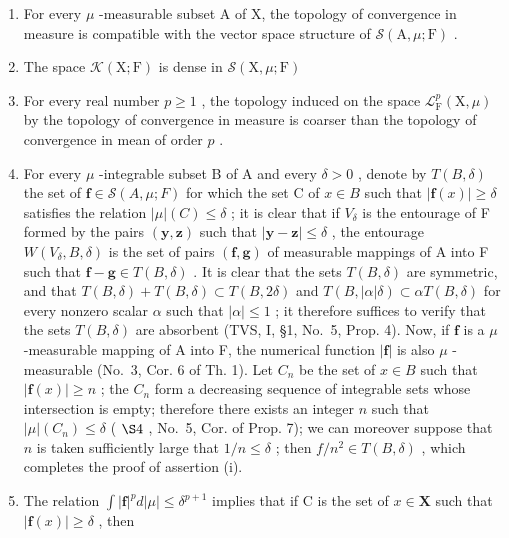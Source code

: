 \begin{enumerate}
\def\labelenumi{(\roman{enumi})}
\item
  For every \(\mu\) -measurable subset A of X, the topology of convergence in measure is compatible with the vector space structure of \(\mathcal{S}(\mathrm{A},\mu;\mathrm{F})\) .
\item
  The space \(\mathcal{K}(\mathrm{X};\mathrm{F})\) is dense in \(\mathcal{S}(\mathrm{X},\mu ;\mathrm{F})\)
\item
  For every real number \(p \geqslant 1\) , the topology induced on the space \(\mathcal{L}_{\mathrm{F}}^{p}(\mathrm{X},\mu)\) by the topology of convergence in measure is coarser than the topology of convergence in mean of order \(p\) .
\setcounter{enumi}{0}
\item
  For every \(\mu\) -integrable subset B of A and every \(\delta > 0\) , denote by \(T(B, \delta)\) the set of \(\mathbf{f} \in \mathcal{S}(A, \mu; F)\) for which the set C of \(x \in B\) such that \(|\mathbf{f}(x)| \geqslant \delta\) satisfies the relation \(|\mu|(C) \leqslant \delta\) ; it is clear that if \(V_{\delta}\) is the entourage of F formed by the pairs \((\mathbf{y}, \mathbf{z})\) such that \(|\mathbf{y} - \mathbf{z}| \leqslant \delta\) , the entourage \(W(V_{\delta}, B, \delta)\) is the set of pairs \((\mathbf{f}, \mathbf{g})\) of measurable mappings of A into F such that \(\mathbf{f} - \mathbf{g} \in T(B, \delta)\) . It is clear that the sets \(T(B, \delta)\) are symmetric, and that \(T(B, \delta) + T(B, \delta) \subset T(B, 2\delta)\) and \(T(B, |\alpha| \delta) \subset \alpha T(B, \delta)\) for every nonzero scalar \(\alpha\) such that \(|\alpha| \leqslant 1\) ; it therefore suffices to verify that the sets \(T(B, \delta)\) are absorbent (TVS, I, §1, No.~5, Prop. 4). Now, if \(\mathbf{f}\) is a \(\mu\) -measurable mapping of A into F, the numerical function \(|\mathbf{f}|\) is also \(\mu\) -measurable (No.~3, Cor. 6 of Th. 1). Let \(C_n\) be the set of \(x \in B\) such that \(|\mathbf{f}(x)| \geqslant n\) ; the \(C_n\) form a decreasing sequence of integrable sets whose intersection is empty; therefore there exists an integer \(n\) such that \(|\mu|(C_n) \leqslant \delta\) ( \(\S 4\) , No.~5, Cor. of Prop. 7); we can moreover suppose that \(n\) is taken sufficiently large that \(1/n \leqslant \delta\) ; then \(f/n^2 \in T(B, \delta)\) , which completes the proof of assertion (i).
\setcounter{enumi}{2}
\item
  The relation \(\int |\mathbf{f}|^p d|\mu| \leqslant \delta^{p+1}\) implies that if C is the set of \(x \in \mathbf{X}\) such that \(|\mathbf{f}(x)| \geqslant \delta\) , then
\end{enumerate}

